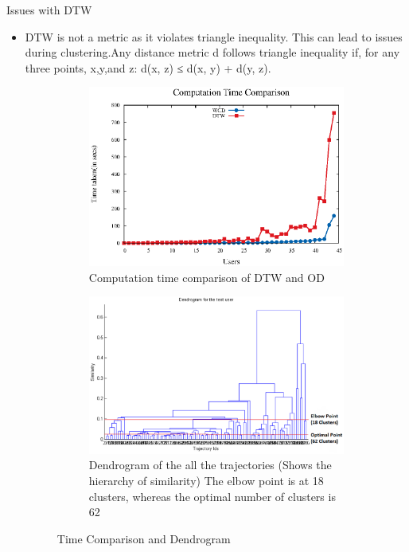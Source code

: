 Issues with DTW
\begin{itemize}
\item
DTW is not a metric as it violates triangle inequality. This can lead to issues during clustering.Any distance metric d follows triangle inequality if, for any three points, x,y,and z: d(x, z) ≤ d(x, y) + d(y, z).    

\begin{figure}
	\begin{subfigure}{.5\textwidth}
    	\centering     
		\includegraphics[scale=0.6]{figs/time.eps}
		\caption{Computation time comparison of DTW and OD }
		\label{fig:time_dtw_od}   
    \end{subfigure}%
	\begin{subfigure}{.5\textwidth}
       \centering     
\includegraphics[scale=0.4]{figs/new/dendrogram.eps}
\caption{Dendrogram of the all the trajectories (Shows the hierarchy of similarity) The elbow point is at 18 clusters, whereas the optimal number of clusters is 62 }
\label{fig:dendrogram}  
    \end{subfigure}
     \caption{Time Comparison and Dendrogram}
    \label{fig:den}    
\end{figure}


\end{itemize}
